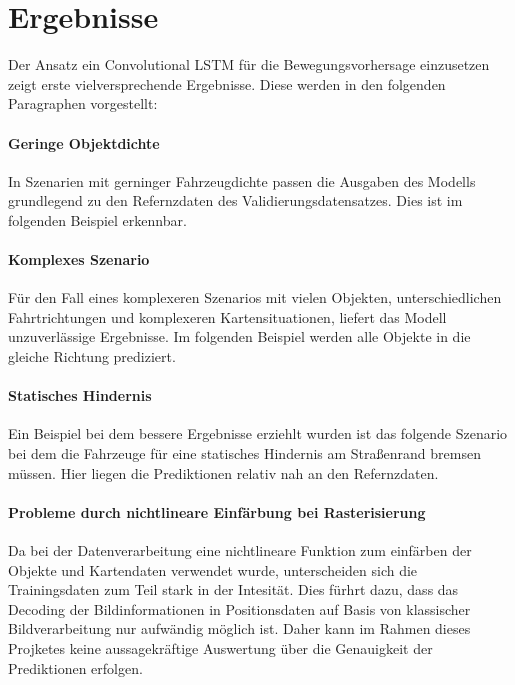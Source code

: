 \documentclass[12pt]{article}
\begin{document}
\section{Ergebnisse}
    Der Ansatz ein Convolutional LSTM für die Bewegungsvorhersage einzusetzen zeigt erste vielversprechende Ergebnisse. 
    Diese werden in den folgenden Paragraphen vorgestellt:

    \paragraph{Geringe Objektdichte} In Szenarien mit gerninger Fahrzeugdichte passen die Ausgaben des Modells grundlegend zu den Refernzdaten des Validierungsdatensatzes.
    Dies ist im folgenden Beispiel erkennbar. %

    \paragraph{Komplexes Szenario} Für den Fall eines komplexeren Szenarios mit vielen Objekten, unterschiedlichen Fahrtrichtungen und komplexeren Kartensituationen, liefert das Modell unzuverlässige Ergebnisse.
    Im folgenden Beispiel werden alle Objekte in die gleiche Richtung prediziert. %

    \paragraph{Statisches Hindernis} Ein Beispiel bei dem bessere Ergebnisse erziehlt wurden ist das folgende Szenario bei dem die Fahrzeuge für eine statisches Hindernis am Straßenrand bremsen müssen. 
    Hier liegen die Prediktionen relativ nah an den Refernzdaten. %

    \paragraph{Probleme durch nichtlineare Einfärbung bei Rasterisierung} Da bei der Datenverarbeitung eine 
    nichtlineare Funktion zum einfärben der Objekte und Kartendaten verwendet wurde, unterscheiden sich die Trainingsdaten 
    zum Teil stark in der Intesität. Dies fürhrt dazu, dass das Decoding der Bildinformationen in Positionsdaten auf 
    Basis von klassischer Bildverarbeitung nur aufwändig möglich ist. Daher kann im Rahmen dieses Projketes keine aussagekräftige 
    Auswertung über die Genauigkeit der Prediktionen erfolgen.
\end{document}
